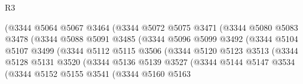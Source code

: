 \begin{lexlean}{R3}
\begin{coremodule}
                                (@3344
                                  @5064
                                  @5067
                                  @3464
                                  (@3344
                                    @5072
                                    @5075
                                    @3471
                                    (@3344
                                      @5080
                                      @5083
                                      @3478
                                      (@3344
                                        @5088
                                        @5091
                                        @3485
                                        (@3344
                                          @5096
                                          @5099
                                          @3492
                                          (@3344
                                            @5104
                                            @5107
                                            @3499
                                            (@3344
                                              @5112
                                              @5115
                                              @3506
                                              (@3344
                                                @5120
                                                @5123
                                                @3513
                                                (@3344
                                                  @5128
                                                  @5131
                                                  @3520
                                                  (@3344
                                                    @5136
                                                    @5139
                                                    @3527
                                                    (@3344
                                                      @5144
                                                      @5147
                                                      @3534
                                                      (@3344
                                                        @5152
                                                        @5155
                                                        @3541
                                                        (@3344
                                                          @5160
                                                          @5163

\end{coremodule}
\end{lexlean}
